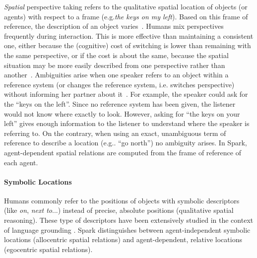 \documentclass[preprint,3p,times]{elsarticle}
\newcommand{\ie}{i.e.\xspace}
\newcommand{\eg}{e.g.\xspace}
\begin{document}
\emph{Spatial} perspective taking refers to the qualitative spatial location of
objects (or agents) with respect to a frame (\eg \emph{the keys on my left}).
Based on this frame of reference, the description of an object
varies~\cite{Marin2008}. Humans mix perspectives frequently during interaction.
This is more effective than maintaining a consistent one, either because the
(cognitive) cost of switching is lower than remaining with the same
perspective, or if the cost is about the same, because the spatial situation
may be more easily described from one perspective rather than
another~\cite{Tversky1999}. Ambiguities arise when one speaker refers to an
object within a reference system (or changes the reference system, \ie switches
perspective) without informing her partner about it~\cite{Breazeal2006,
Ros2010}. For example, the speaker could ask for the ``keys on the left''.
Since no reference system has been given, the listener would not know where
exactly to look.  However, asking for ``the keys on your left'' gives enough
information to the listener to understand where the speaker is referring to. On
the contrary, when using an exact, unambiguous term of reference to describe a
location (\eg. ``go north'') no ambiguity arises.
In {\sc Spark}, agent-dependent spatial relations are computed from the frame of
reference of each agent.

\paragraph{Symbolic Locations}

Humans commonly refer to the positions of objects with symbolic descriptors
(like \emph{on}, \emph{next to}...) instead of precise, absolute positions
(qualitative spatial reasoning). These type of descriptors have been extensively studied in the context of language grounding
\cite{O'Keefe1999,Matuszek2010,Regier2001,Kelleher2006,Blisard2005}.  {\sc
Spark} distinguishes between agent-independent symbolic locations (allocentric
spatial relations) and agent-dependent, relative locations (egocentric spatial
relations).
\end{document}
